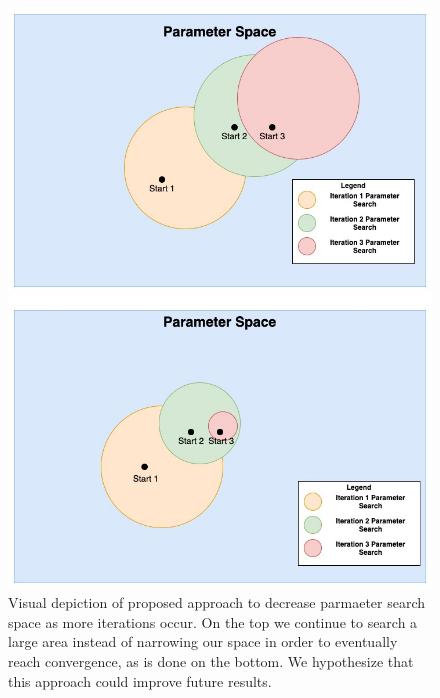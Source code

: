 \begin{figure}[H]
    \centering
    \includegraphics[width=15cm]{Kalman_Filter_Images/Decreasing_Param_Space .jpg}
    \caption{Visual depiction of proposed approach to decrease parmaeter search space as more iterations occur. On the top we continue to search a large area instead of narrowing our space in order to eventually reach convergence, as is done on the bottom. We hypothesize that this approach could improve future results.}
    \label{fig:Discussion_UKF_ChangingVariances}
\end{figure}


